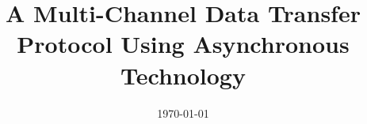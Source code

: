 \documentclass[a4paper, 11pt, oneside]{Thesis}  %
\begin{document}
\frontmatter      %

\title  {A Multi-Channel Data Transfer Protocol Using Asynchronous Technology}
\addresses  {\groupname\\\deptname\\\univname}  %
\date       {\today}
\subject    {}
\keywords   {}

\maketitle


\fancyhead{}  %
\rhead{\thepage}  %
\lhead{}  %

\pagestyle{fancy}  %





\end{document}
